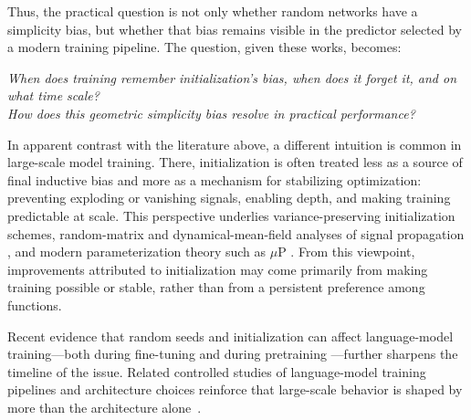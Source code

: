\documentclass{article}
\begin{document}
Thus, the practical question is not only whether random networks have a simplicity bias, but whether that bias remains visible in the predictor selected by a modern training pipeline.
The question, given these works, becomes:
\vspace{-0.3em}
\begin{center}
    \textit{When does training remember initialization's bias, when does it forget it, and on what time scale?}\\
    \textit{How does this geometric simplicity bias resolve in practical performance?}
\end{center}
\vspace{-0.3em}
In apparent contrast with the literature above, a different intuition is common in large-scale model training.  There, initialization is often treated less as a source of final inductive bias and more as a mechanism for stabilizing optimization: preventing exploding or vanishing signals, enabling depth, and making training predictable at scale. This perspective underlies variance-preserving initialization schemes, random-matrix and dynamical-mean-field analyses of signal propagation \citep{glorot2010understanding,he2015delving,
poole2016exponential,schoenholz2017deep,pennington2017resurrecting,
hanin2018start,hanin2018gradients,xiao2018dynamical,chen2018dynamical}, and modern parameterization theory such as $\mu$P \citep{yang2021feature,yang2021tensorv,bordelon2023self,
bordelon2024finite,bordelon2025deep,lauditi2025adaptive}.   From this viewpoint, improvements attributed to initialization may come primarily from making training possible or stable, rather than from a persistent preference among functions.

Recent evidence that random seeds and initialization can affect
language-model training---both during fine-tuning
\citep{dodge2020finetuning} and during pretraining
\citep{vanderwal2025polypythias,fehlauer2025convergence,tong2026seedprints,li2026transformersborn}---further sharpens the timeline of the issue.
Related controlled studies of language-model training pipelines and
architecture choices reinforce that large-scale behavior is shaped by
more than the architecture alone~\citep{allenzhu2024physics31,allenzhu2025physics41}.

\end{document}
